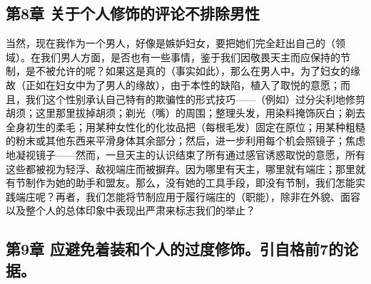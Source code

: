 
\subsection{第8章 关于个人修饰的评论不排除男性}

当然，现在我作为一个男人，好像是嫉妒妇女，要把她们完全赶出自己的（领域）。在我们男人方面，是否也有一些事情，鉴于我们因敬畏天主而应保持的节制，是不被允许的呢？如果这是真的（事实如此），那么在男人中，为了妇女的缘故（正如在妇女中为了男人的缘故），由于本性的缺陷，植入了取悦的意愿；而且，我们这个性别承认自己特有的欺骗性的形式技巧——（例如）过分尖利地修剪胡须；这里那里拔掉胡须；剃光（嘴）的周围；整理头发，用染料掩饰灰白；剃去全身初生的柔毛；用某种女性化的化妆品把（每根毛发）固定在原位；用某种粗糙的粉末或其他东西来平滑身体其余部分；然后，进一步利用每个机会照镜子；焦虑地凝视镜子——然而，一旦天主的认识结束了所有通过感官诱惑取悦的意愿，所有这些都被视为轻浮、敌视端庄而被摒弃。因为哪里有天主，哪里就有端庄；那里就有节制作为她的助手和盟友。那么，没有她的工具手段，即没有节制，我们怎能实践端庄呢？再者，我们怎能将节制应用于履行端庄的（职能），除非在外貌、面容以及整个人的总体印象中表现出严肃来标志我们的举止？\par


\subsection{第9章 应避免着装和个人的过度修饰。引自格前7的论据。}

